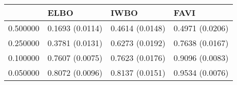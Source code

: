 \begin{tabular}{llll}
\toprule
 & ELBO & IWBO & FAVI \\
\midrule
0.500000 & 0.1693 (0.0114) & 0.4614 (0.0148) & 0.4971 (0.0206) \\
0.250000 & 0.3781 (0.0131) & 0.6273 (0.0192) & 0.7638 (0.0167) \\
0.100000 & 0.7607 (0.0075) & 0.7623 (0.0176) & 0.9096 (0.0083) \\
0.050000 & 0.8072 (0.0096) & 0.8137 (0.0151) & 0.9534 (0.0076) \\
\bottomrule
\end{tabular}
